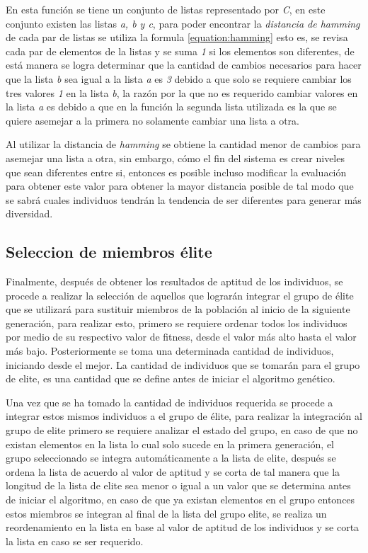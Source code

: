 En esta función se tiene un conjunto de listas representado por \textit{C}, en
este conjunto existen las listas \textit{a, b y c}, para poder encontrar la
\textit{distancia de hamming} de cada par de listas se utiliza la formula
\ref{equation:hamming} esto es, se revisa cada par de elementos de la listas y
se suma \textit{1} si los elementos son diferentes, de está manera se logra
determinar que la cantidad de cambios necesarios para hacer que la lista
\textit{b} sea igual a la lista \textit{a} es \textit{3} debido a
que solo se requiere cambiar los tres valores \textit{1} en la lista \textit{b},
la razón por la que no es requerido cambiar valores en la lista \textit{a} es
debido a que en la función la segunda lista utilizada es la que se quiere
asemejar a la primera no solamente cambiar una lista a otra.

Al utilizar la distancia de \textit{hamming} se obtiene 
la cantidad menor de cambios para asemejar una lista a otra, sin
embargo, cómo el fin del sistema es crear niveles que sean diferentes entre si,
entonces es posible incluso modificar la evaluación para obtener este valor para
obtener la mayor distancia posible de tal modo que se sabrá cuales individuos
tendrán la tendencia de ser diferentes para generar más diversidad.

\subsection{Seleccion de miembros élite}
\label{subsection:elite_selection}

Finalmente, después de obtener los resultados de aptitud de los individuos, se
procede a realizar la selección de aquellos que lograrán integrar el grupo de
élite que se utilizará para sustituir miembros de la población al inicio de la
siguiente generación, para realizar esto, primero se requiere ordenar todos los
individuos por medio de su respectivo valor de fitness, desde el valor más alto
hasta el valor más bajo. Posteriormente se toma una determinada cantidad de
individuos, iniciando desde el mejor. La cantidad de individuos que se tomarán
para el grupo de elite, es una cantidad que se define antes de iniciar el
algoritmo genético.

Una vez que se ha tomado la cantidad de individuos requerida se procede a
integrar estos mismos individuos a el grupo de élite, para realizar la
integración al grupo de elite primero se requiere analizar el estado del grupo,
en caso de que no existan elementos en la lista lo cual solo sucede en la
primera generación, el grupo seleccionado se integra automáticamente a la lista
de elite, después se ordena la lista de acuerdo al valor de aptitud y se corta de
tal manera que la longitud de la lista de elite sea menor o igual a un valor que
se determina antes de iniciar el algoritmo, en caso de que ya existan elementos
en el grupo entonces estos miembros se integran al final de la lista del grupo
elite, se realiza un reordenamiento en la lista en base al valor de aptitud de
los individuos y se corta la lista en caso se ser requerido.

